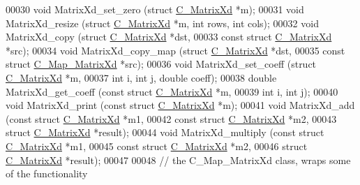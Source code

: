\begin{DoxyCode}
00030   \textcolor{keywordtype}{void}    MatrixXd\_set\_zero   (\textcolor{keyword}{struct} \hyperlink{struct_c___matrix_xd}{C\_MatrixXd} *m);
00031   \textcolor{keywordtype}{void}    MatrixXd\_resize     (\textcolor{keyword}{struct} \hyperlink{struct_c___matrix_xd}{C\_MatrixXd} *m, \textcolor{keywordtype}{int} rows, \textcolor{keywordtype}{int} cols);
00032   \textcolor{keywordtype}{void}    MatrixXd\_copy       (\textcolor{keyword}{struct} \hyperlink{struct_c___matrix_xd}{C\_MatrixXd} *dst,
00033                                \textcolor{keyword}{const} \textcolor{keyword}{struct} \hyperlink{struct_c___matrix_xd}{C\_MatrixXd} *src);
00034   \textcolor{keywordtype}{void}    MatrixXd\_copy\_map   (\textcolor{keyword}{struct} \hyperlink{struct_c___matrix_xd}{C\_MatrixXd} *dst,
00035                                \textcolor{keyword}{const} \textcolor{keyword}{struct} \hyperlink{struct_c___map___matrix_xd}{C\_Map\_MatrixXd} *src);  
00036   \textcolor{keywordtype}{void}    MatrixXd\_set\_coeff  (\textcolor{keyword}{struct} \hyperlink{struct_c___matrix_xd}{C\_MatrixXd} *m,
00037                                \textcolor{keywordtype}{int} i, \textcolor{keywordtype}{int} j, \textcolor{keywordtype}{double} coeff);
00038   \textcolor{keywordtype}{double}  MatrixXd\_get\_coeff  (\textcolor{keyword}{const} \textcolor{keyword}{struct} \hyperlink{struct_c___matrix_xd}{C\_MatrixXd} *m,
00039                                \textcolor{keywordtype}{int} i, \textcolor{keywordtype}{int} j);
00040   \textcolor{keywordtype}{void}    MatrixXd\_print      (\textcolor{keyword}{const} \textcolor{keyword}{struct} \hyperlink{struct_c___matrix_xd}{C\_MatrixXd} *m);
00041   \textcolor{keywordtype}{void}    MatrixXd\_add        (\textcolor{keyword}{const} \textcolor{keyword}{struct} \hyperlink{struct_c___matrix_xd}{C\_MatrixXd} *m1,
00042                                \textcolor{keyword}{const} \textcolor{keyword}{struct} \hyperlink{struct_c___matrix_xd}{C\_MatrixXd} *m2,
00043                                \textcolor{keyword}{struct} \hyperlink{struct_c___matrix_xd}{C\_MatrixXd} *result);  
00044   \textcolor{keywordtype}{void}    MatrixXd\_multiply   (\textcolor{keyword}{const} \textcolor{keyword}{struct} \hyperlink{struct_c___matrix_xd}{C\_MatrixXd} *m1,
00045                                \textcolor{keyword}{const} \textcolor{keyword}{struct} \hyperlink{struct_c___matrix_xd}{C\_MatrixXd} *m2,
00046                                \textcolor{keyword}{struct} \hyperlink{struct_c___matrix_xd}{C\_MatrixXd} *result);
00047   
00048   \textcolor{comment}{// the C\_Map\_MatrixXd class, wraps some of the functionality}

\end{DoxyCode}
